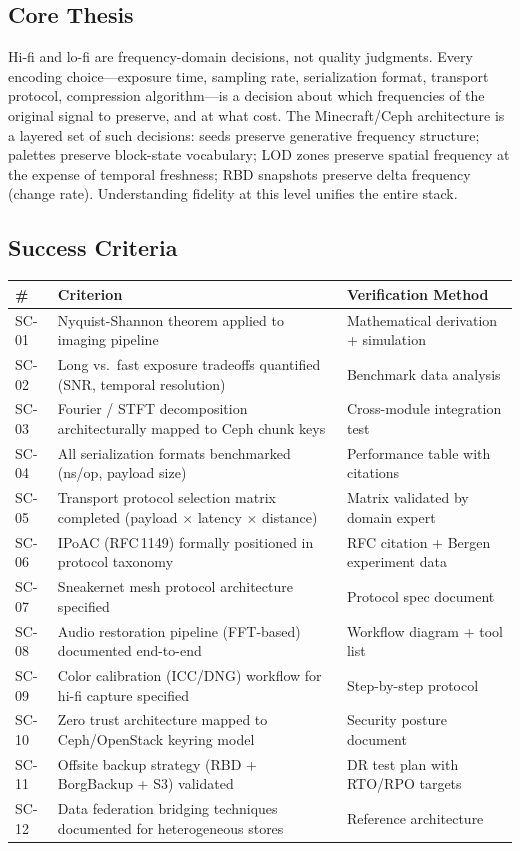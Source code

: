 \documentclass[11pt,letterpaper]{article}
\newcommand{\thead}[1]{\cellcolor{TableHead}\textbf{\sffamily\color{white}\small #1}}
\newcommand{\altrow}{\rowcolor{TableAlt}}
\begin{document}
\subsection{Core Thesis}

Hi-fi and lo-fi are frequency-domain decisions, not quality judgments. Every encoding choice---exposure time, sampling rate, serialization format, transport protocol, compression algorithm---is a decision about which frequencies of the original signal to preserve, and at what cost. The Minecraft/Ceph architecture is a layered set of such decisions: seeds preserve generative frequency structure; palettes preserve block-state vocabulary; LOD zones preserve spatial frequency at the expense of temporal freshness; RBD snapshots preserve delta frequency (change rate). Understanding fidelity at this level unifies the entire stack.

\subsection{Success Criteria}

\begin{longtable}{p{0.5cm}p{6.5cm}p{5cm}}
\toprule
\thead{\#} & \thead{Criterion} & \thead{Verification Method} \\
\midrule
\endhead
SC-01 & Nyquist-Shannon theorem applied to imaging pipeline & Mathematical derivation + simulation \\
\altrow SC-02 & Long vs.\ fast exposure tradeoffs quantified (SNR, temporal resolution) & Benchmark data analysis \\
SC-03 & Fourier / STFT decomposition architecturally mapped to Ceph chunk keys & Cross-module integration test \\
\altrow SC-04 & All serialization formats benchmarked (ns/op, payload size) & Performance table with citations \\
SC-05 & Transport protocol selection matrix completed (payload $\times$ latency $\times$ distance) & Matrix validated by domain expert \\
\altrow SC-06 & IPoAC (RFC\,1149) formally positioned in protocol taxonomy & RFC citation + Bergen experiment data \\
SC-07 & Sneakernet mesh protocol architecture specified & Protocol spec document \\
\altrow SC-08 & Audio restoration pipeline (FFT-based) documented end-to-end & Workflow diagram + tool list \\
SC-09 & Color calibration (ICC/DNG) workflow for hi-fi capture specified & Step-by-step protocol \\
\altrow SC-10 & Zero trust architecture mapped to Ceph/OpenStack keyring model & Security posture document \\
SC-11 & Offsite backup strategy (RBD + BorgBackup + S3) validated & DR test plan with RTO/RPO targets \\
\altrow SC-12 & Data federation bridging techniques documented for heterogeneous stores & Reference architecture \\
\bottomrule
\end{longtable}
\end{document}
